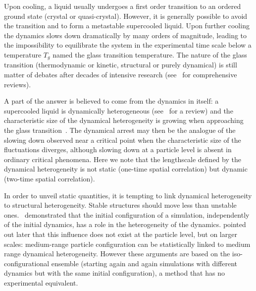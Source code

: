 
Upon cooling, a liquid usually undergoes a first order transition to an ordered ground state (crystal or quasi-crystal). However, it is generally possible to avoid the transition and to form a metastable supercooled liquid. Upon further cooling the dynamics slows down dramatically by many orders of magnitude, leading to the impossibility to equilibrate the system in the experimental time scale below a temperature $T_g$ named the glass transition temperature. The nature of the glass transition (thermodynamic or kinetic, structural or purely dynamical) is still matter of debates after decades of intensive research (see~\citep{cavagna2009supercooled,BerthierR} for comprehensive reviews).

A part of the answer is believed to come from the dynamics in itself: a supercooled liquid is dynamically heterogeneous (see~\citep{BerthierR} for a review) and the characteristic size of the dynamical heterogeneity is growing when approaching the glass transition~\citep{yamamoto1998, Donati1999a}. The dynamical arrest may then be the analogue of the slowing down observed near a critical point when the characteristic size of the fluctuations diverges, although slowing down at a particle level is absent in ordinary critical phenomena. Here we note that the lengthscale defined by the dynamical heterogeneity is not static (one-time spatial correlation) but dynamic (two-time spatial correlation). 

In order to unveil static quantities, it is tempting to link dynamical heterogeneity to structural heterogeneity. Stable structures should move less than unstable ones.~\citet{Widmer-Cooper2005} demonstrated that the initial configuration of a simulation, independently of the initial dynamics, has a role in the heterogeneity of the dynamics. \citet{Berthier2007} pointed out later that this influence does not exist at the particle level, but on larger scales: medium-range particle configuration can be statistically linked to medium range dynamical heterogeneity. However these arguments are based on the iso-configurational ensemble (starting again and again simulations with different dynamics but with the same initial configuration), a method that has no experimental equivalent.


